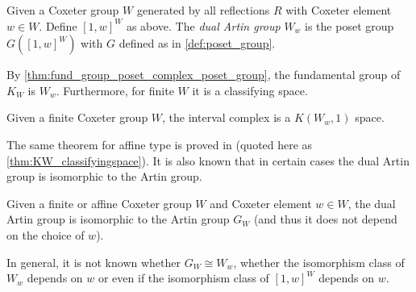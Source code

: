 \documentclass[class=article, crop=false]{standalone}
\begin{document}
\begin{definition}
    Given a Coxeter group $W$ generated by all reflections $R$ with Coxeter element $w \in W$. Define $[1,w]^W$ as above. The \emph{dual Artin group} $W_w$ is the poset group $G([1,w]^W)$ with $G$ defined as in \cref{def:poset_group}.
\end{definition}

By \cref{thm:fund_group_poset_complex_poset_group}, the fundamental group of $K_{W}$ is $W_w$. Furthermore, for finite $W$ it is a classifying space.

\begin{theorem}
    Given a finite Coxeter group $W$, the interval complex is a $K(W_w,1)$ space.
    \label{thm:interval_cx_k_pi_1_finite}
\end{theorem}

The same theorem for affine type is proved in \cite{paolini_salvetti_kpi1_2021} (quoted here as \cref{thm:KW_classifyingspace}). It is also known that in certain cases the dual Artin group is isomorphic to the Artin group.

\begin{theorem}
    Given a finite \cite{bessis_dual_2003} or affine \cite{mccammond_sulway_artin_2017} Coxeter group $W$ and Coxeter element $w \in W$, the dual Artin group is isomorphic to the Artin group $G_W$ (and thus it does not depend on the choice of $w$).
    \label{thm:dual_artin_iso_artin}
\end{theorem}

In general, it is not known whether $G_W \cong W_w$, whether the isomorphism class of $W_w$ depends on $w$ or even if the isomorphism class of $[1,w]^W$ depends on $w$.
\end{document}
